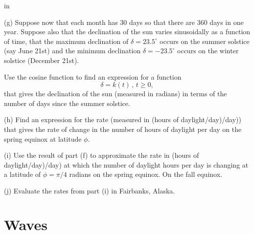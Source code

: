 \documentclass{ximera}
\newcommand{\pskip}{\vskip 0.1 in}
\begin{document}
\begin{question}
\pskip 

(g) Suppose now that each month has 30 days so that there are 360 days in one year. Suppose also that the declination of the sun varies sinusoidally as a function of time, that the maximum declination of $\delta = 23.5^\circ$ occurs on the summer solstice (say June 21st) and the minimum declination $\delta = -23.5^\circ$ occurs on the winter solstice (December 21st). 

Use the cosine function to find an expression for a function
\[
     \delta = k(t) \, , \, t\geq 0,
\]
that gives the declination of the sun (measured in radians) in terms of the number of days since the summer solstice. 

(h) Find an expression for the rate (measured in (hours of daylight/day)/day)) that gives the rate of change in the number of hours of daylight per day on the spring equinox at latitude $\phi$.

(i) Use the result of part (f) to approximate the rate in (hours of daylight/day)/day) at which the number of daylight hours per day is changing at a latitude of $\phi = \pi/4$ radians on the spring equinox. On the fall equinox. 

(j) Evaluate the rates from part (i) in Fairbanks, Alaska.


\end{question}


\section*{Waves}
\end{document}
